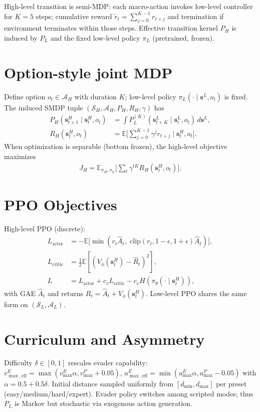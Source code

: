 \documentclass[11pt]{article}
\begin{document}
High-level transition is semi-MDP: each macro-action invokes low-level controller for $K=5$ steps; cumulative reward $\tilde{r}_t=\sum_{j=0}^{K-1} r_{t+j}$ and termination if environment terminates within those steps. Effective transition kernel $P_H$ is induced by $P_L$ and the fixed low-level policy $\pi_L$ (pretrained, frozen).

\section{Option-style joint MDP}
Define option $o_t\in\mathcal{A}_H$ with duration $K$; low-level policy $\pi_L(\cdot\mid \bm{s}^L, o_t)$ is fixed. The induced SMDP tuple $(\mathcal{S}_H,\mathcal{A}_H,P_H,R_H,\gamma)$ has
\begin{align*}
P_H(\bm{s}^H_{t+1}\mid \bm{s}^H_t, o_t) &= \int P_L^{(K)}(\bm{s}^L_{t+K}\mid \bm{s}^L_t, o_t)\, d\bm{s}^L,\\
R_H(\bm{s}^H_t,o_t) &= \mathbb{E}\bigg[\sum_{j=0}^{K-1} \gamma^j r_{t+j} \mid \bm{s}^H_t,o_t \bigg].
\end{align*}
When optimization is separable (bottom frozen), the high-level objective maximizes
\begin{align*}
J_H = \mathbb{E}_{\pi_H,\pi_L}\Bigg[\sum_{t} \gamma^{tK} R_H(\bm{s}^H_t,o_t)\Bigg].
\end{align*}

\section{PPO Objectives}
High-level PPO (discrete):
\begin{align*}
L_{\text{actor}} &= -\mathbb{E}\big[\min(r_t\hat{A}_t,\; \text{clip}(r_t,1-\epsilon,1+\epsilon)\hat{A}_t)\big],\\
L_{\text{critic}} &= \tfrac{1}{2}\mathbb{E}[(V_\phi(\bm{s}^H_t)-\hat{R}_t)^2],\\
L &= L_{\text{actor}} + c_v L_{\text{critic}} - c_e H(\pi_\theta(\cdot\mid\bm{s}^H_t)),
\end{align*}
with GAE $\hat{A}_t$ and returns $\hat{R}_t=\hat{A}_t+V_\phi(\bm{s}^H_t)$. Low-level PPO shares the same form on $(\mathcal{S}_L,\mathcal{A}_L)$.

\section{Curriculum and Asymmetry}
Difficulty $\delta\in[0,1]$ rescales evader capability: $v^E_{\max,\text{eff}}=\max(v^E_{\max}\alpha, v^P_{\max}+0.05)$, $a^E_{\max,\text{eff}}=\min(a^E_{\max}\alpha, a^P_{\max}-0.05)$ with $\alpha=0.5+0.5\delta$. Initial distance sampled uniformly from $[d_{\min},d_{\max}]$ per preset (easy/medium/hard/expert). Evader policy switches among scripted modes; thus $P_L$ is Markov but stochastic via exogenous action generation.
\end{document}
